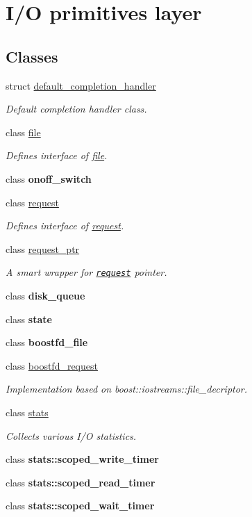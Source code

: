 \hypertarget{group__iolayer}{
\section{I/O primitives layer}
\label{group__iolayer}
}
\subsection*{Classes}
\begin{CompactItemize}
\item 
struct \hyperlink{structdefault__completion__handler}{default\_\-completion\_\-handler}
\begin{CompactList}\small\item\em Default completion handler class. \item\end{CompactList}\item 
class \hyperlink{classfile}{file}
\begin{CompactList}\small\item\em Defines interface of \hyperlink{classfile}{file}. \item\end{CompactList}\item 
class \textbf{onoff\_\-switch}
\item 
class \hyperlink{classrequest}{request}
\begin{CompactList}\small\item\em Defines interface of \hyperlink{classrequest}{request}. \item\end{CompactList}\item 
class \hyperlink{classrequest__ptr}{request\_\-ptr}
\begin{CompactList}\small\item\em A smart wrapper for {\tt \hyperlink{classrequest}{request}} pointer. \item\end{CompactList}\item 
class \textbf{disk\_\-queue}
\item 
class \textbf{state}
\item 
class \textbf{boostfd\_\-file}
\item 
class \hyperlink{classboostfd__request}{boostfd\_\-request}
\begin{CompactList}\small\item\em Implementation based on boost::iostreams::file\_\-decriptor. \item\end{CompactList}\item 
class \hyperlink{classstats}{stats}
\begin{CompactList}\small\item\em Collects various I/O statistics. \item\end{CompactList}\item 
class \textbf{stats::scoped\_\-write\_\-timer}
\item 
class \textbf{stats::scoped\_\-read\_\-timer}
\item 
class \textbf{stats::scoped\_\-wait\_\-timer}
\end{CompactItemize}
